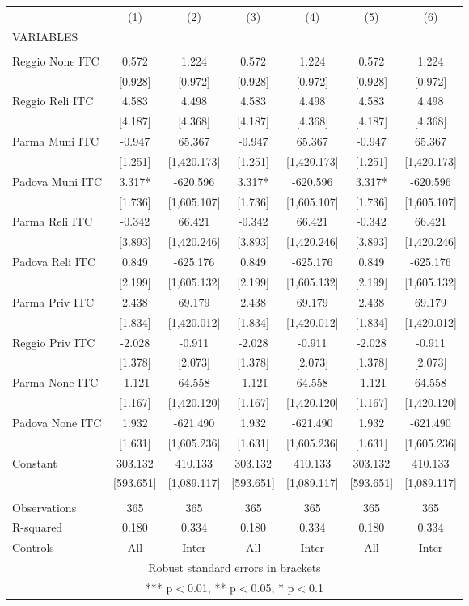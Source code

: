 \begin{tabular}{lcccccc} \hline
 & (1) & (2) & (3) & (4) & (5) & (6) \\
VARIABLES &  &  &  &  &  &  \\ \hline
 &  &  &  &  &  &  \\
Reggio None ITC & 0.572 & 1.224 & 0.572 & 1.224 & 0.572 & 1.224 \\
 & [0.928] & [0.972] & [0.928] & [0.972] & [0.928] & [0.972] \\
Reggio Reli ITC & 4.583 & 4.498 & 4.583 & 4.498 & 4.583 & 4.498 \\
 & [4.187] & [4.368] & [4.187] & [4.368] & [4.187] & [4.368] \\
Parma Muni ITC & -0.947 & 65.367 & -0.947 & 65.367 & -0.947 & 65.367 \\
 & [1.251] & [1,420.173] & [1.251] & [1,420.173] & [1.251] & [1,420.173] \\
Padova Muni ITC & 3.317* & -620.596 & 3.317* & -620.596 & 3.317* & -620.596 \\
 & [1.736] & [1,605.107] & [1.736] & [1,605.107] & [1.736] & [1,605.107] \\
Parma Reli ITC & -0.342 & 66.421 & -0.342 & 66.421 & -0.342 & 66.421 \\
 & [3.893] & [1,420.246] & [3.893] & [1,420.246] & [3.893] & [1,420.246] \\
Padova Reli ITC & 0.849 & -625.176 & 0.849 & -625.176 & 0.849 & -625.176 \\
 & [2.199] & [1,605.132] & [2.199] & [1,605.132] & [2.199] & [1,605.132] \\
Parma Priv ITC & 2.438 & 69.179 & 2.438 & 69.179 & 2.438 & 69.179 \\
 & [1.834] & [1,420.012] & [1.834] & [1,420.012] & [1.834] & [1,420.012] \\
Reggio Priv ITC & -2.028 & -0.911 & -2.028 & -0.911 & -2.028 & -0.911 \\
 & [1.378] & [2.073] & [1.378] & [2.073] & [1.378] & [2.073] \\
Parma None ITC & -1.121 & 64.558 & -1.121 & 64.558 & -1.121 & 64.558 \\
 & [1.167] & [1,420.120] & [1.167] & [1,420.120] & [1.167] & [1,420.120] \\
Padova None ITC & 1.932 & -621.490 & 1.932 & -621.490 & 1.932 & -621.490 \\
 & [1.631] & [1,605.236] & [1.631] & [1,605.236] & [1.631] & [1,605.236] \\
Constant & 303.132 & 410.133 & 303.132 & 410.133 & 303.132 & 410.133 \\
 & [593.651] & [1,089.117] & [593.651] & [1,089.117] & [593.651] & [1,089.117] \\
 &  &  &  &  &  &  \\
Observations & 365 & 365 & 365 & 365 & 365 & 365 \\
R-squared & 0.180 & 0.334 & 0.180 & 0.334 & 0.180 & 0.334 \\
 Controls & All & Inter & All & Inter & All & Inter \\ \hline
\multicolumn{7}{c}{ Robust standard errors in brackets} \\
\multicolumn{7}{c}{ *** p$<$0.01, ** p$<$0.05, * p$<$0.1} \\
\end{tabular}

